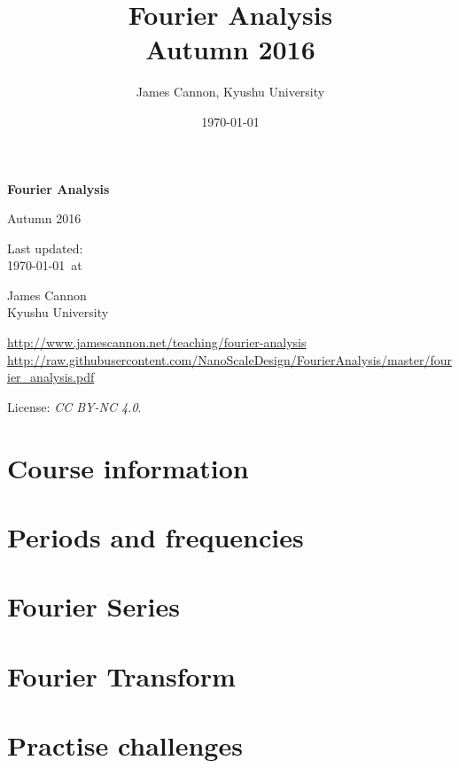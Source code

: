 \documentclass[a4paper]{book} %
\title{Fourier Analysis\\Autumn 2016}
\author{James Cannon, Kyushu University}
\date{\today}
\newcommand{\courseurl}{fourier-analysis}
\begin{document}
\begin{titlepage}
    \begin{center}
        \vspace*{1cm}

        \Huge
        \textbf{Fourier Analysis}

        Autumn 2016

        \vspace{1.5cm}
        \Large
        Last updated:\\\today \ at \currenttime

        \vspace{4.0cm}
        \LARGE
        James Cannon\\Kyushu University
         \vfill

        \normalsize
        \url{http://www.jamescannon.net/teaching/\courseurl}
        \vspace{0.2cm}
        \small
        \url{http://raw.githubusercontent.com/NanoScaleDesign/FourierAnalysis/master/fourier_analysis.pdf}
        \vspace{0.5cm}

        License: \emph{CC BY-NC 4.0}.

    \end{center}
\end{titlepage}

\setcounter{chapter}{-1}

\tableofcontents

\chapter{Course information}
\newpage





\chapter{Periods and frequencies}

\chapter{Fourier Series}

\chapter{Fourier Transform}

\appendix 
\chapter{Practise challenges}

\end{document}
